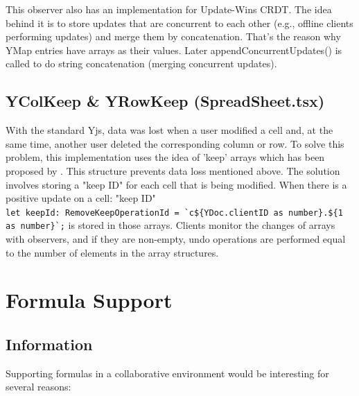 \documentclass{article}
\begin{document}
This observer also has an implementation for Update-Wins CRDT. 
The idea behind it is to store updates that are concurrent to each other (e.g., offline clients performing updates) and merge them by concatenation. 
That's the reason why YMap entries have arrays as their values. 
Later appendConcurrentUpdates() is called to do string concatenation (merging concurrent updates).

\subsection{YColKeep \& YRowKeep (SpreadSheet.tsx)}

With the standard Yjs, data was lost when a user modified a cell and, at the same time,
another user deleted the corresponding column or row. 
To solve this problem, this implementation uses the idea of 'keep' arrays which has been proposed by \cite{yanakieva2023study}. 
This structure prevents data loss mentioned above. 
The solution involves storing a "keep ID" for each cell that is being modified. 
When there is a positive update on a cell: "keep ID" \\ \verb |let keepId: RemoveKeepOperationId = `c${YDoc.clientID as number}.${1 as number}`;| 
is stored in those arrays. Clients monitor the changes of arrays with observers, and if they are non-empty, 
undo operations are performed equal to the number of elements in the array structures.

\section{Formula Support}

\subsection{Information}

Supporting formulas in a collaborative environment would be interesting for several reasons:
\end{document}

